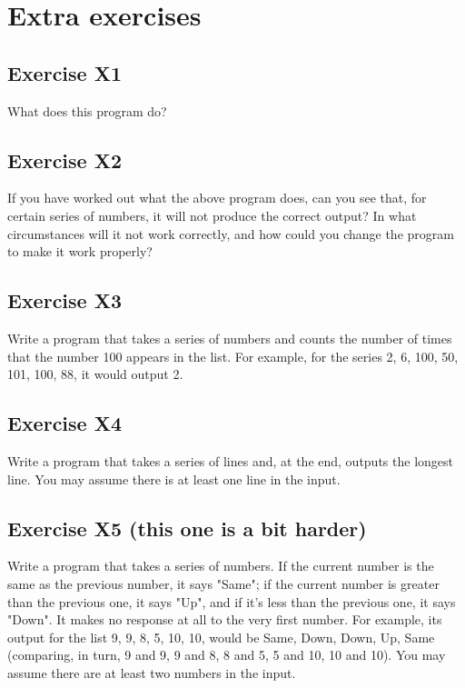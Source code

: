 \section{Extra exercises}
\label{sec:additional-exercises}

\subsection*{Exercise X1}

What does this program do?


\subsection*{Exercise X2}

If you have worked out what the above program does, can you
see that, for certain series of numbers, it will not produce the correct
output?  In what circumstances will it not work correctly, and how could
you change the program to make it work properly?

\subsection*{Exercise X3}

Write a program that takes a series of numbers and counts
the number of times that the number 100 appears in the list.  For example,
for the series 2, 6, 100, 50, 101, 100, 88, it would output 2.

\subsection*{Exercise X4}

Write a program that takes a series of lines and,
at the end, outputs the longest line.
You may assume there is at least one line in the input.

\subsection*{Exercise X5 (this one is a bit harder)}

Write a program that takes
a series of numbers.  If the
current number is the same as the previous number, it says "Same";
if the current number is greater than the previous one, it says "Up",
and if it's less than the previous one, it says "Down".
It makes no response at all to the
very first number.  For example, its output for the list 9, 9, 8, 5, 10, 10,
would be Same, Down, Down, Up, Same
(comparing, in turn, 9 and 9, 9 and 8, 8 and 5, 5 and 10, 10 and 10).
You may assume there are at least two numbers in the input.


